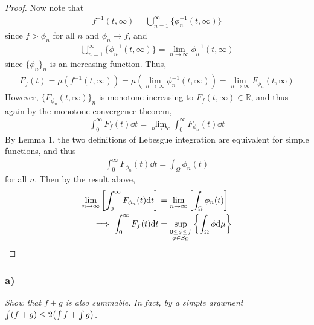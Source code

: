 \documentclass[12pt]{article}
\theoremstyle{plain}
\begin{document}
\begin{proof}
    Now note that
    \begin{align*}
        f^{-1}(t, \infty) = \bigcup_{n=1}^\infty\{\phi_n^{-1}(t, \infty)\}
    \end{align*}
    since $f > \phi_n$ for all $n$ and $\phi_n \rightarrow f$, and
    \begin{align*}
        \bigcup_{n=1}^\infty\{\phi_n^{-1}(t, \infty)\} = \lim_{n\rightarrow \infty} \phi_n^{-1}(t, \infty)
    \end{align*}
    since $\{\phi_n\}_n$ is an increasing function.  Thus,
    \begin{align*}
        F_f(t) = \mu(f^{-1}(t, \infty)) = \mu(\lim_{n\rightarrow \infty} \phi_n^{-1}(t, \infty)) = \lim_{n\rightarrow \infty}F_{\phi_n}(t, \infty)
    \end{align*}
    However, $\{F_{\phi_n}(t, \infty)\}_n$ is monotone increasing to $F_f(t, \infty) \in \mathbb{R}$, and thus again by the monotone convergence theorem,
    \begin{align*}
        \int_0^\infty F_f(t) \dd t = \lim_{n\rightarrow \infty}\int_0^\infty F_{\phi_n}(t)\dd t
    \end{align*}
    By Lemma 1, the two definitions of Lebesgue integration are equivalent for simple functions, and thus
    \begin{align*}
        \int_0^\infty F_{\phi_n}(t) \dd t = \int_\Omega \phi_n(t)
    \end{align*}
    for all $n$.  Then by the result above,
    \begin{align*}
        \lim_{n\rightarrow \infty}\qty[\int_0^\infty F_{\phi_n}(t) \dd t] &= \lim_{n\rightarrow \infty}\qty[\int_\Omega \phi_n(t)] \\
        \implies \int_0^\infty F_f(t) \dd t &= \sup_{\substack{0 \leq \phi\leq f \\ \phi \in S_\Omega}}\left\{\int_\Omega \phi \dd \mu\right\}
    \end{align*}
\end{proof}

\subsubsection*{ a)}
\textit{Show that $f + g$ is also summable.  In fact, by a simple argument $\int(f + g) \leq 2\qty(\int f + \int g)$.} \\
\end{document}
